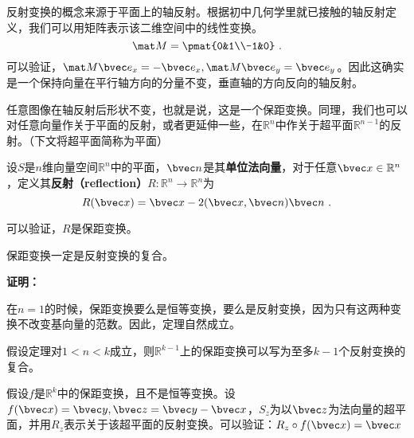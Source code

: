 反射变换的概念来源于平面上的轴反射。根据初中几何学里就已接触的轴反射定义，我们可以用矩阵表示该二维空间中的线性变换。
\begin{equation}
\mat M=\pmat{0&1\\-1&0}~.
\end{equation}
可以验证，$\mat M\bvec e_x=-\bvec e_x,\mat M \bvec e_y=\bvec e_y$。因此这确实是一个保持向量在平行轴方向的分量不变，垂直轴的方向反向的轴反射。

任意图像在轴反射后形状不变，也就是说，这是一个保距变换。同理，我们也可以对任意向量作关于平面的反射，或者更延伸一些，在$\mathbb R^n$中作关于超平面$\mathbb R^{n-1}$的反射。（下文将超平面简称为平面）
\begin{definition}{}
设$S$是$n$维向量空间$\mathbb R^n$中的平面，$\bvec n$是其\textbf{单位法向量}，对于任意$\bvec x\in \mathbb R^n$，定义其\textbf{反射（reflection）}$R:\mathbb R^n\rightarrow \mathbb R^n$为
\begin{equation}
R(\bvec x)=\bvec x-2(\bvec x,\bvec n)\bvec n~.
\end{equation}
\end{definition}
可以验证，$R$是保距变换。


\begin{theorem}{}
保距变换一定是反射变换的复合。
\end{theorem}
\textbf{证明：}

在$n=1$的时候，保距变换要么是恒等变换，要么是反射变换，因为只有这两种变换不改变基向量的范数。因此，定理自然成立。

假设定理对$1<n<k$成立，则$\mathbb R^{k-1}$上的保距变换可以写为至多$k-1$个反射变换的复合。 

假设$f$是$\mathbb R^k$中的保距变换，且不是恒等变换。设$f(\bvec x)=\bvec y,\bvec z=\bvec y-\bvec x$，$S_z$为以$\bvec z$为法向量的超平面，并用$R_z$表示关于该超平面的反射变换。可以验证：$R_z\circ f(\bvec x)=\bvec x$